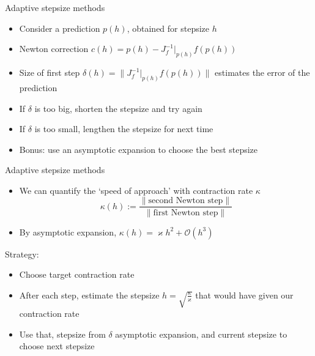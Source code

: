\documentclass[presentation]{beamer}
\begin{document}
\begin{frame}[label={sec:org61a5437}]{Adaptive stepsize methods}
\begin{itemize}
\item Consider a prediction \(p(h)\), obtained for stepsize \(h\)
\item Newton correction \(c(h) = p(h) - J_f^{-1}|_{p(h)}f\left(p(h)\right)\)
\item Size of first step \(\delta(h)=\|J_{f}^{-1}|_{p(h)}f(p(h))\|\) estimates the error of the prediction
\item If \(\delta\) is too big, shorten the stepsize and try again
\item If \(\delta\) is too small, lengthen the stepsize for next time
\item Bonus: use an asymptotic expansion to choose the best stepsize
\end{itemize}
\end{frame}
\begin{frame}[label={sec:org4e43717}]{Adaptive stepsize methods}
\begin{itemize}
\item We can quantify the `speed of approach' with contraction rate \(\kappa\)
\[\kappa(h) := \frac{\|\text{second Newton step}\|}{\|\text{first Newton step}\|}\]
\item By asymptotic expansion, \(\kappa(h) = \varkappa h^2 + \mathcal{O}(h^3)\)
\end{itemize}
\vfill
Strategy:
\begin{itemize}
\item Choose target contraction rate
\item After each step, estimate the stepsize \(h=\sqrt{\frac{\kappa}{\varkappa}}\) that would have given our contraction rate
\item Use that, stepsize from \(\delta\) asymptotic expansion, and current stepsize to choose next stepsize
\end{itemize}
\end{frame}
\end{document}
